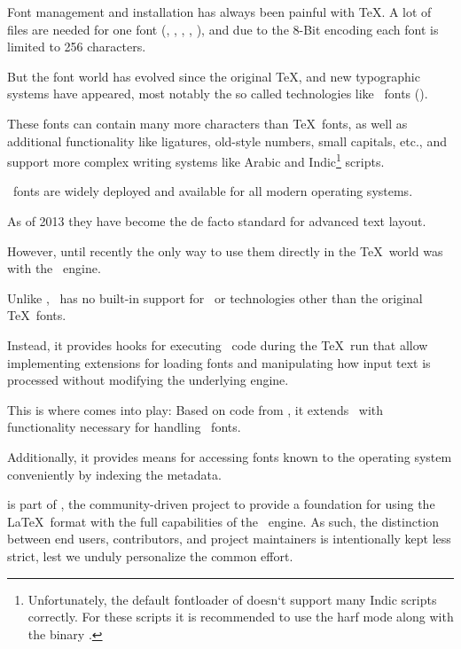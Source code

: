 Font management and installation has always been painful with \TeX.  A
lot of files are needed for one font (, ,
, , ), and due to the 8-Bit encoding
each font is limited to 256 characters.

But the font world has evolved since the original \TeX, and new
typographic systems have appeared, most notably the so called
 technologies like \OpenType\ fonts ().

These fonts can contain many more characters than \TeX\ fonts, as well
as additional functionality like ligatures, old-style numbers, small
capitals, etc., and support more complex writing systems like Arabic
and Indic\footnote{%
  Unfortunately, the default fontloader of  doesn‘t support many Indic
  scripts correctly. For these scripts it is recommended to use the harf mode along with the binary .}
scripts.

\OpenType\ fonts are widely deployed and available for all modern
operating systems.

As of 2013 they have become the de facto standard for advanced text
layout.

However, until recently the only way to use them directly in the \TeX\
world was with the \XeTeX\ engine.

Unlike \XeTeX, \LuaTeX\ has no built-in support for \OpenType\ or
technologies other than the original \TeX\ fonts.

Instead, it provides hooks for executing \Lua\ code during the \TeX\ run
that allow implementing extensions for loading fonts and manipulating
how input text is processed without modifying the underlying engine.

This is where  comes into play:
Based on code from \ConTeXt, it extends \LuaTeX\ with functionality necessary
for handling \OpenType\ fonts.

Additionally, it provides means for accessing fonts known to the operating
system conveniently by indexing the metadata.

\endsection

\beginsection {Thanks}

 is part of , the community-driven
project to provide a foundation for using the \LaTeX\ format with the
full capabilities of the \LuaTeX\ engine.
%
As such, the distinction between end users, contributors, and project
maintainers is intentionally kept less strict, lest we unduly
personalize the common effort.

